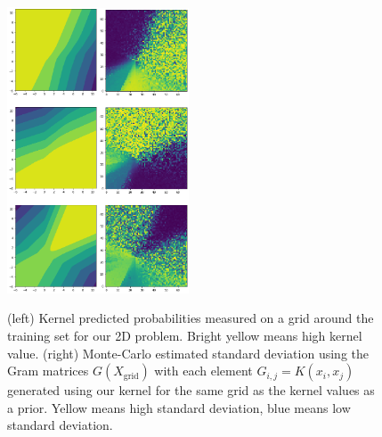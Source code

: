     \begin{figure}[h]
        \centering
        \includegraphics[width=0.24\textwidth]{c4_figures/kers_square.png}\includegraphics[width=0.24\textwidth]{c4_figures/vars_square.png}
        \caption{(left) Kernel predicted probabilities measured on a grid around the training set for our 2D problem. Bright yellow means high kernel value. (right) Monte-Carlo estimated standard deviation using the Gram matrices $G(X_{\text{grid}})$ with each element $G_{i, j} = K(x_i, x_j)$ generated using our kernel for the same grid as the kernel values as a prior. Yellow means high standard deviation, blue means low standard deviation.}
        \label{fig:cov}
    \end{figure}


